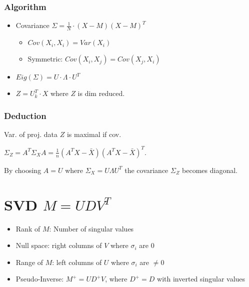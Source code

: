 \documentclass[11pt,twocolumn]{article}
\begin{document}
\subsubsection{Algorithm}

\begin{itemize}
\item Covariance $\Sigma = \frac{1}{N} \cdot (  X - M ) ( X - M )^T$
\begin{itemize}
\item $Cov(X_i, X_i) = Var(X_i)$
\item Symmetric: $ Cov(X_i,X_j) = Cov(X_j, X_i)$
\end{itemize}
\item $Eig(\Sigma) = U \cdot \Lambda \cdot U^T$
\item $Z = U_k^T \cdot X$ where $Z$ is dim reduced.

\end{itemize}

\subsubsection{Deduction} 
Var. of proj. data $Z$ is maximal if cov.

$\Sigma_Z = A^T \Sigma_X A = \frac{1}{n} (A^TX - \bar{X})(A^TX - \bar{X})^T $.

By choosing $A = U$ where $\Sigma_X = U \Lambda U^T$ the covariance $\Sigma_Z$ becomes diagonal.


\section{SVD $M = U D V^T$}

\begin{itemize}


\item Rank of $M$: Number of singular values
\item Null space: right columns of $V$ where $\sigma_i$ are 0
\item Range of $M$: left columns of $U$ where $\sigma_i$ are $\neq 0$
\item Pseudo-Inverse: $M^+ = U D^+ V$, where $D^+ = D$ with inverted singular values

\end{itemize}
\end{document}
